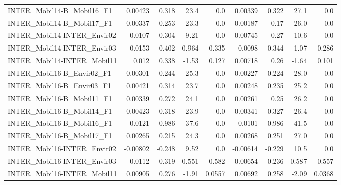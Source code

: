 \begin{tabular}{lrrrrrrrr}
INTER\_Mobil14-B\_Mobil16\_F1                &     0.00423 &        0.318 &    23.4 &      0.0 &    0.00339 &       0.322 &         27.1 &           0.0 \\
INTER\_Mobil14-B\_Mobil17\_F1                &     0.00337 &        0.253 &    23.3 &      0.0 &    0.00187 &        0.17 &         26.0 &           0.0 \\
INTER\_Mobil14-INTER\_Envir02               &     -0.0107 &       -0.304 &    9.21 &      0.0 &   -0.00745 &       -0.27 &         10.6 &           0.0 \\
INTER\_Mobil14-INTER\_Envir03               &      0.0153 &        0.402 &   0.964 &    0.335 &     0.0098 &       0.344 &         1.07 &         0.286 \\
INTER\_Mobil14-INTER\_Mobil11               &       0.012 &        0.338 &   -1.53 &    0.127 &    0.00718 &        0.26 &        -1.64 &         0.101 \\
INTER\_Mobil16-B\_Envir02\_F1                &    -0.00301 &       -0.244 &    25.3 &      0.0 &   -0.00227 &      -0.224 &         28.0 &           0.0 \\
INTER\_Mobil16-B\_Envir03\_F1                &     0.00421 &        0.314 &    23.7 &      0.0 &    0.00248 &       0.235 &         25.2 &           0.0 \\
INTER\_Mobil16-B\_Mobil11\_F1                &     0.00339 &        0.272 &    24.1 &      0.0 &    0.00261 &        0.25 &         26.2 &           0.0 \\
INTER\_Mobil16-B\_Mobil14\_F1                &     0.00423 &        0.318 &    23.9 &      0.0 &    0.00341 &       0.327 &         26.4 &           0.0 \\
INTER\_Mobil16-B\_Mobil16\_F1                &      0.0121 &        0.986 &    37.6 &      0.0 &     0.0101 &       0.986 &         41.5 &           0.0 \\
INTER\_Mobil16-B\_Mobil17\_F1                &     0.00265 &        0.215 &    24.3 &      0.0 &    0.00268 &       0.251 &         27.0 &           0.0 \\
INTER\_Mobil16-INTER\_Envir02               &    -0.00802 &       -0.248 &    9.52 &      0.0 &   -0.00614 &      -0.229 &         10.5 &           0.0 \\
INTER\_Mobil16-INTER\_Envir03               &      0.0112 &        0.319 &   0.551 &    0.582 &    0.00654 &       0.236 &        0.587 &         0.557 \\
INTER\_Mobil16-INTER\_Mobil11               &     0.00905 &        0.276 &   -1.91 &   0.0557 &    0.00692 &       0.258 &        -2.09 &        0.0368 \\

\end{tabular}

